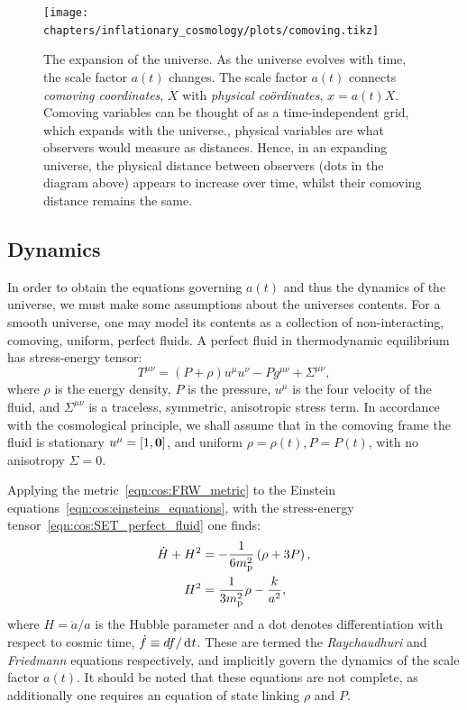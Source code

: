 \begin{figure}[tp]
  \centering
  \texttt{[image: chapters/inflationary\_cosmology/plots/comoving.tikz]}
  \caption{The expansion of the universe. As the universe evolves with time, the scale factor $a(t)$ changes. The scale factor $a(t)$ connects {\em comoving coordinates}, $X$ with {\em physical co\"{o}rdinates}, $x=a(t)X$. Comoving variables can be thought of as a time-independent grid, which expands with the universe.\label{fig:cos:comoving_vs_physical}, physical variables are what observers would measure as distances. Hence, in an expanding universe, the physical distance between observers (dots in the diagram above) appears to increase over time, whilst their comoving distance remains the same.}
\end{figure}


\subsection{Dynamics}
In order to obtain the equations governing $a(t)$ and thus the dynamics of the universe, we must make some assumptions about the universes contents. For a smooth universe, one may model its contents as a collection of non-interacting, comoving, uniform, perfect fluids. A perfect fluid in thermodynamic equilibrium has stress-energy tensor:
\begin{equation}
  T^{\mu\nu} = (P+\rho)u^{\mu}u^{\nu} - P g^{\mu\nu} + \Sigma^{\mu\nu},
  \label{eqn:cos:SET_perfect_fluid}
\end{equation}
where $\rho$ is the energy density, $P$ is the pressure, $u^\mu$ is the four velocity of the fluid, and $\Sigma^{\mu\nu}$ is a traceless, symmetric, anisotropic stress term. In accordance with the cosmological principle, we shall assume that in the comoving frame the fluid is stationary $u^\mu = [1,\mathbf{0}]$, and uniform $\rho=\rho(t),P=P(t)$, with no anisotropy $\Sigma=0$.  

Applying the metric~\eqref{eqn:cos:FRW_metric} to the Einstein equations~\eqref{eqn:cos:einsteins_equations}, with the stress-energy tensor~\eqref{eqn:cos:SET_perfect_fluid} one finds:
\begin{align}
  \dot{H}+H^2 &= 
  -\frac{1}{6m_{\mathrm{p}}^2}\left( \rho + 3P\right), 
  \label{eqn:cos:Raychaudhuri}
  \\
  H^2 &= 
  \frac{1}{3m_{\mathrm{p}}^2}\rho - \frac{k}{a^2}, 
  \label{eqn:cos:Friedmann}
\end{align}
%
where $H=\dot{a}/a$ is the Hubble parameter and a dot denotes differentiation with respect to cosmic time, $\dot{f}\equiv df/\operatorname{d}^{}\!{t}$. These are termed the {\em Raychaudhuri\/} and {\em Friedmann\/} equations respectively, and implicitly govern the dynamics of the scale factor $a(t)$. It should be noted that these equations are not complete, as additionally one requires an equation of state linking $\rho$ and $P$.

